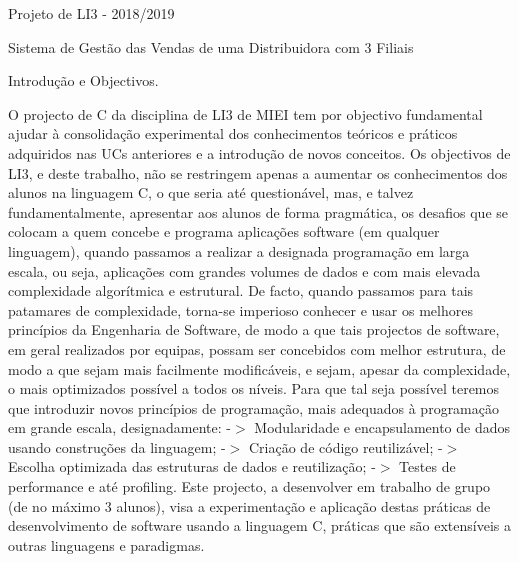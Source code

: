 Projeto de L\+I3 -\/ 2018/2019

Sistema de Gestão das Vendas de uma Distribuidora com 3 Filiais

Introdução e Objectivos.

O projecto de C da disciplina de L\+I3 de M\+I\+EI tem por objectivo fundamental ajudar à consolidação experimental dos conhecimentos teóricos e práticos adquiridos nas U\+Cs anteriores e a introdução de novos conceitos. Os objectivos de L\+I3, e deste trabalho, não se restringem apenas a aumentar os conhecimentos dos alunos na linguagem C, o que seria até questionável, mas, e talvez fundamentalmente, apresentar aos alunos de forma pragmática, os desafios que se colocam a quem concebe e programa aplicações software (em qualquer linguagem), quando passamos a realizar a designada programação em larga escala, ou seja, aplicações com grandes volumes de dados e com mais elevada complexidade algorítmica e estrutural. De facto, quando passamos para tais patamares de complexidade, torna-\/se imperioso conhecer e usar os melhores princípios da Engenharia de Software, de modo a que tais projectos de software, em geral realizados por equipas, possam ser concebidos com melhor estrutura, de modo a que sejam mais facilmente modificáveis, e sejam, apesar da complexidade, o mais optimizados possível a todos os níveis. Para que tal seja possível teremos que introduzir novos princípios de programação, mais adequados à programação em grande escala, designadamente\+: -\/$>$ Modularidade e encapsulamento de dados usando construções da linguagem; -\/$>$ Criação de código reutilizável; -\/$>$ Escolha optimizada das estruturas de dados e reutilização; -\/$>$ Testes de performance e até profiling. Este projecto, a desenvolver em trabalho de grupo (de no máximo 3 alunos), visa a experimentação e aplicação destas práticas de desenvolvimento de software usando a linguagem C, práticas que são extensíveis a outras linguagens e paradigmas. 